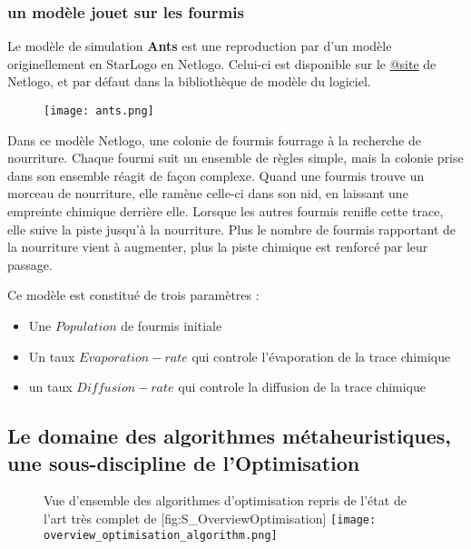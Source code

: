 \subsubsection{un modèle jouet sur les fourmis}

Le modèle de simulation \textbf{Ants} est une reproduction par \textcite{Wilensky1997} d'un modèle originellement en StarLogo en Netlogo. Celui-ci est disponible sur le \href{http://ccl.northwestern.edu/netlogo/models/Ants}{@site} de Netlogo, et par défaut dans la bibliothèque de modèle du logiciel.

\begin{figure}[H]
		\centering
	 	\texttt{[image: ants.png]}
\end{figure}

Dans ce modèle Netlogo, une colonie de fourmis fourrage à la recherche de nourriture. Chaque fourmi suit un ensemble de règles simple, mais la colonie prise dans son ensemble réagit de façon complexe. Quand une fourmis trouve un morceau de nourriture, elle ramène celle-ci dans son nid, en laissant une empreinte chimique derrière elle. Lorsque les autres fourmis renifle cette trace, elle suive la piste jusqu'à la nourriture. Plus le nombre de fourmis rapportant de la nourriture vient à augmenter, plus la piste chimique est renforcé par leur passage.

Ce modèle est constitué de trois paramètres :
\begin{itemize}[label=\textbullet,noitemsep,nolistsep]
\item Une $Population$ de fourmis initiale
\item Un taux $Evaporation-rate$ qui controle l'évaporation de la trace chimique
\item un taux $Diffusion-rate$ qui controle la diffusion de la trace chimique
\end{itemize}



\subsection{Le domaine des algorithmes métaheuristiques, une sous-discipline de l'Optimisation}

\begin{figure}[h]
\begin{sidecaption}[fortoc]{ Vue d'ensemble des algorithmes d'optimisation repris de l'état de l'art très complet de \textcite[32]{Weise2011}}[fig:S_OverviewOptimisation]
  \centering
 \texttt{[image: overview\_optimisation\_algorithm.png]}
  \end{sidecaption}
\end{figure}

